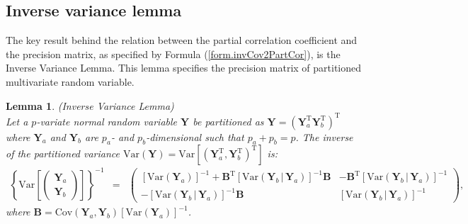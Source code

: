 \documentclass[a4paper]{article}
\theoremstyle{myexamplestyle}
\newtheorem{lemma}{Lemma}
\begin{document}
\subsection{Inverse variance lemma}
The key result behind the relation between the partial correlation coefficient and the precision matrix, as specified by Formula  (\ref{form.invCov2PartCor}), is the Inverse Variance Lemma. This lemma specifies the precision matrix of partitioned multivariate random variable.

\begin{lemma} (Inverse Variance Lemma)
\\
Let a $p$-variate normal random variable $\mathbf{Y}$ be partitioned as $\mathbf{Y} = (\mathbf{Y}_a^{\mathrm{T}} \mathbf{Y}_b^{\mathrm{T}})^{\mathrm{T}}$ where $\mathbf{Y}_a$ and $\mathbf{Y}_b$ are $p_a$- and $p_b$-dimensional such that $p_a + p_b = p$. The inverse of the partitioned variance $\mbox{Var} (\mathbf{Y}) =  \mbox{Var}[ (\mathbf{Y}_a^{\mathrm{T}}, \mathbf{Y}_b^{\mathrm{T}})^{\mathrm{T}}]$ is:
\begin{eqnarray*}
\left\{ \mbox{Var} \left[ \left( \begin{array}{l} \mathbf{Y}_a \\ \mathbf{Y}_b \end{array} \right) \right] \right\}^{-1} & = &  
\left( 
\begin{array}{rr} 
[\mbox{Var}(\mathbf{Y}_a )]^{-1} + \mathbf{B}^{\mathrm{T}} [\mbox{Var}(\mathbf{Y}_b  \, | \, \mathbf{Y}_a )]^{-1} \mathbf{B}
&
- \mathbf{B}^{\mathrm{T}} [\mbox{Var}(\mathbf{Y}_b  \, | \, \mathbf{Y}_a )]^{-1}
\\ 
- [\mbox{Var}(\mathbf{Y}_b  \, | \, \mathbf{Y}_a )]^{-1} \mathbf{B} & [\mbox{Var}(\mathbf{Y}_b  \, | \, \mathbf{Y}_a )]^{-1}
\end{array} 
\right),
\end{eqnarray*}
where $\mathbf{B} = \mbox{Cov}( \mathbf{Y}_a, \mathbf{Y}_b ) [\mbox{Var}(\mathbf{Y}_a )]^{-1}$.
\end{lemma}
\end{document}

